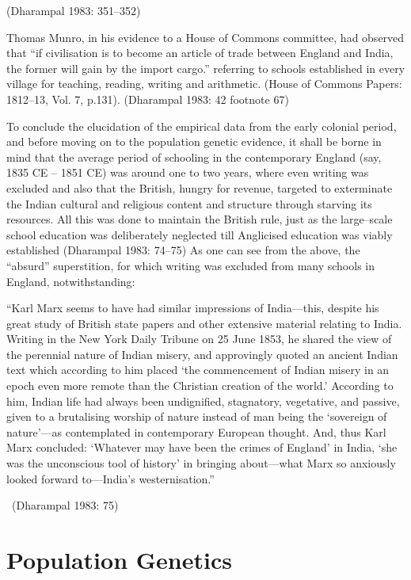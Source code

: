 \begin{flushright}
(Dharampal 1983: 351–352)
\end{flushright}

Thomas Munro, in his evidence to a House of Commons committee, had observed that “if civilisation is to become an article of trade between England and India, the former will gain by the import cargo.” referring to schools established in every village for teaching, reading, writing and arithmetic. (House of Commons Papers: 1812–13, Vol. 7, p.131). (Dharampal 1983: 42 footnote 67)

To conclude the elucidation of the empirical data from the early colonial period, and before moving on to the population genetic evidence, it shall be borne in mind that the average period of schooling in the contemporary England (say, 1835 CE – 1851 CE) was around one to two years, where even writing was excluded and also that the British, hungry for revenue, targeted to exterminate the Indian cultural and religious content and structure through starving its resources. All this was done to maintain the British rule, just as the large–scale school education was deliberately neglected till Anglicised education was viably established (Dharampal 1983: 74–75) As one can see from the above, the “absurd” superstition, for which writing was excluded from many schools in England, notwithstanding:

\begin{myquote}
“Karl Marx seems to have had similar impressions of India—this, despite his great study of British state papers and other extensive material relating to India. Writing in the New York Daily Tribune on 25 June 1853, he shared the view of the perennial nature of Indian misery, and approvingly quoted an ancient Indian text which according to him placed ‘the commencement of Indian misery in an epoch even more remote than the Christian creation of the world.’ According to him, Indian life had always been undignified, stagnatory, vegetative, and passive, given to a brutalising worship of nature instead of man being the ‘sovereign of nature’—as contemplated in contemporary European thought. And, thus Karl Marx concluded: ‘Whatever may have been the crimes of England’ in India, ‘she was the unconscious tool of history’ in bringing about—what Marx so anxiously looked forward to—India’s westernisation.” 

~\hfill (Dharampal 1983: 75)
\end{myquote}


\section*{Population Genetics}

